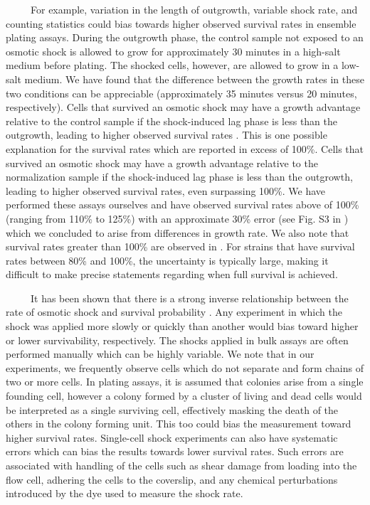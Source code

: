 \documentclass[12pt]{caltech_thesis}
\begin{document}
~~~~~For example, variation in the length of outgrowth, variable shock
rate, and counting statistics could bias towards higher observed
survival rates in ensemble plating assays. During the outgrowth phase,
the control sample not exposed to an osmotic shock is allowed to grow
for approximately 30 minutes in a high-salt medium before plating. The
shocked cells, however, are allowed to grow in a low-salt medium. We
have found that the difference between the growth rates in these two
conditions can be appreciable (approximately 35 minutes versus 20
minutes, respectively). Cells that survived an osmotic shock may have a
growth advantage relative to the control sample if the shock-induced lag
phase is less than the outgrowth, leading to higher observed survival
rates \autocite{levina1999}. This is one possible explanation for the
survival rates which are reported in excess of 100\%. Cells that
survived an osmotic shock may have a growth advantage relative to the
normalization sample if the shock-induced lag phase is less than the
outgrowth, leading to higher observed survival rates, even surpassing
100\%. We have performed these assays ourselves and have observed
survival rates above of 100\% (ranging from 110\% to 125\%) with an
approximate 30\% error (see Fig. S3 in \textcite{bialecka-fornal2012})
which we concluded to arise from differences in growth rate. We also
note that survival rates greater than 100\% are observed in
\textcite{vandenberg2016}. For strains that have survival rates between
80\% and 100\%, the uncertainty is typically large, making it difficult
to make precise statements regarding when full survival is achieved.

~~~~~It has been shown that there is a strong inverse relationship
between the rate of osmotic shock and survival probability
\autocite{bialecka-fornal2015}. Any experiment in which the shock was
applied more slowly or quickly than another would bias toward higher or
lower survivability, respectively. The shocks applied in bulk assays are
often performed manually which can be highly variable. We note that in
our experiments, we frequently observe cells which do not separate and
form chains of two or more cells. In plating assays, it is assumed that
colonies arise from a single founding cell, however a colony formed by a
cluster of living and dead cells would be interpreted as a single
surviving cell, effectively masking the death of the others in the
colony forming unit. This too could bias the measurement toward higher
survival rates. Single-cell shock experiments can also have systematic
errors which can bias the results towards lower survival rates. Such
errors are associated with handling of the cells such as shear damage
from loading into the flow cell, adhering the cells to the coverslip,
and any chemical perturbations introduced by the dye used to measure the
shock rate.
\end{document}
